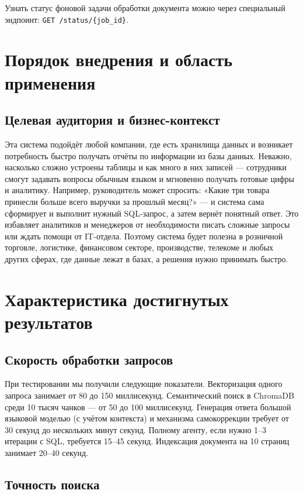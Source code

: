 Узнать статус фоновой задачи обработки документа можно через специальный эндпоинт: \texttt{GET /status/\{job\_id\}}.

\section{Порядок внедрения и область применения}

\subsection{Целевая аудитория и бизнес-контекст}

Эта система подойдёт любой компании, где есть хранилища данных и возникает потребность быстро получать отчёты по информации из базы данных. Неважно, насколько сложно устроены таблицы и как много в них записей — сотрудники смогут задавать вопросы обычным языком и мгновенно получать готовые цифры и аналитику. Например, руководитель может спросить: «Какие три товара принесли больше всего выручки за прошлый месяц?» — и система сама сформирует и выполнит нужный SQL-запрос, а затем вернёт понятный ответ. Это избавляет аналитиков и менеджеров от необходимости писать сложные запросы или ждать помощи от IT-отдела. Поэтому система будет полезна в розничной торговле, логистике, финансовом секторе, производстве, телекоме и любых других сферах, где данные лежат в базах, а решения нужно принимать быстро.

\section{Характеристика достигнутых результатов}

\subsection{Скорость обработки запросов}

При тестировании мы получили следующие показатели. Векторизация одного запроса занимает от 80 до 150 миллисекунд. Семантический поиск в ChromaDB среди 10 тысяч чанков — от 50 до 100 миллисекунд. Генерация ответа большой языковой моделью (с учётом контекста) и механизма самокоррекции требует от 30 секунд до нескольких минут секунд. Полному агенту, если нужно 1–3 итерации с SQL, требуется 15–45 секунд. Индексация документа на 10 страниц занимает 20–40 секунд.

\subsection{Точность поиска}

